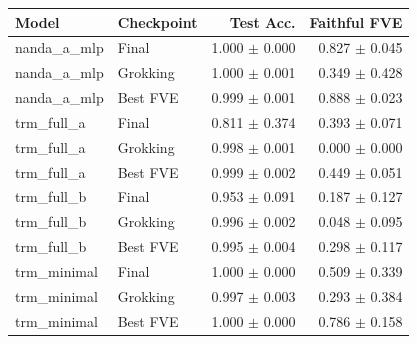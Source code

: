 \begin{tabular}{llrr}
\toprule
Model & Checkpoint & Test Acc. & Faithful FVE \\
\midrule
nanda\_a\_mlp & Final & 1.000 $\pm$ 0.000 & 0.827 $\pm$ 0.045 \\
nanda\_a\_mlp & Grokking & 1.000 $\pm$ 0.001 & 0.349 $\pm$ 0.428 \\
nanda\_a\_mlp & Best FVE & 0.999 $\pm$ 0.001 & 0.888 $\pm$ 0.023 \\
trm\_full\_a & Final & 0.811 $\pm$ 0.374 & 0.393 $\pm$ 0.071 \\
trm\_full\_a & Grokking & 0.998 $\pm$ 0.001 & 0.000 $\pm$ 0.000 \\
trm\_full\_a & Best FVE & 0.999 $\pm$ 0.002 & 0.449 $\pm$ 0.051 \\
trm\_full\_b & Final & 0.953 $\pm$ 0.091 & 0.187 $\pm$ 0.127 \\
trm\_full\_b & Grokking & 0.996 $\pm$ 0.002 & 0.048 $\pm$ 0.095 \\
trm\_full\_b & Best FVE & 0.995 $\pm$ 0.004 & 0.298 $\pm$ 0.117 \\
trm\_minimal & Final & 1.000 $\pm$ 0.000 & 0.509 $\pm$ 0.339 \\
trm\_minimal & Grokking & 0.997 $\pm$ 0.003 & 0.293 $\pm$ 0.384 \\
trm\_minimal & Best FVE & 1.000 $\pm$ 0.000 & 0.786 $\pm$ 0.158 \\
\bottomrule
\end{tabular}
